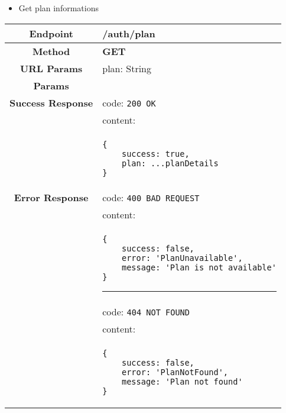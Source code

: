     \begin{itemize}
        \item Get plan informations
    \end{itemize}
    \begin{adjustwidth}{1cm}{}
        \begin{tabular}{|c|l|}
            \hline
            \textbf{Endpoint} & /auth/plan \\
            \hline
            \textbf{Method} & \textbf{GET} \\
            \hline
            \textbf{URL Params} &  plan: String \\
            \hline
            \textbf{Params} & \\
            \hline
            \textbf{Success Response} & code: \texttt{200 OK} \\
            &                           content: \\
            & \begin{minipage}[t]{0.5\textwidth}
                \begin{adjustwidth}{1.5cm}{}
                \begin{verbatim}
{
    success: true, 
    plan: ...planDetails
}
                \end{verbatim}
                \end{adjustwidth}
              \end{minipage} \\
              \hline
            \textbf{Error Response} & code: \texttt{400 BAD REQUEST} \\
            &                         content: \\
            & \begin{minipage}[t]{0.7\textwidth}
                \begin{adjustwidth}{1.5cm}{}
                \begin{verbatim}
{
    success: false, 
    error: 'PlanUnavailable',
    message: 'Plan is not available'
}
                \end{verbatim}
                \end{adjustwidth}
                \par\noindent\rule{1.2\textwidth}{1pt}
                 \vspace{4pt}
              \end{minipage} \\
              
              &                     code: \texttt{404 NOT FOUND} \\
              &                     content: \\
              & \begin{minipage}[t]{0.7\textwidth}
                \begin{adjustwidth}{1.5cm}{}
                \begin{verbatim}
{
    success: false, 
    error: 'PlanNotFound',
    message: 'Plan not found'
}
                \end{verbatim}
                \end{adjustwidth}
                

\end{minipage}
\end{tabular}
\end{adjustwidth}
